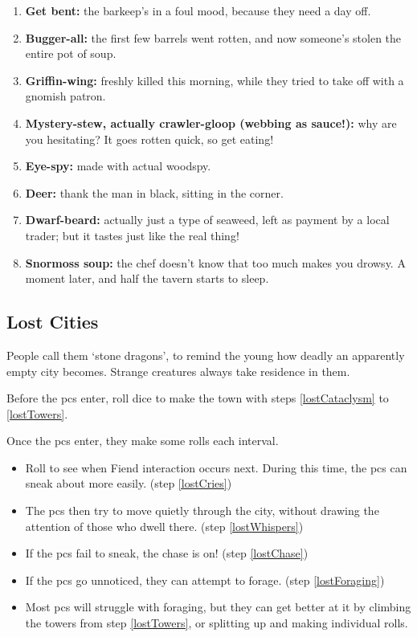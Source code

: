\begin{multicols}{2}
\begin{enumerate}
\item
  \textbf{Get bent:} the barkeep's in a foul mood, because they need a day off.
\item
  \textbf{Bugger-all:} the first few barrels went rotten, and now someone's stolen the entire pot of soup.
\item
  \textbf{Griffin-wing:} freshly killed this morning, while they tried to take off with a gnomish patron.
\item
  \textbf{Mystery-stew, actually crawler-gloop (webbing as sauce!):} why are you hesitating?
  It goes rotten quick, so get eating!
\item
  \textbf{Eye-spy:} made with actual woodspy.
\item
  \textbf{Deer:} thank the man in black, sitting in the corner.
\item
  \textbf{Dwarf-beard:} actually just a type of seaweed, left as payment by a local trader; but it tastes just like the real thing!
\item
  \textbf{Snormoss soup:} the chef doesn't know that too much makes you drowsy.
  A moment later, and half the tavern starts to sleep.
\end{enumerate}

\subsection{Lost Cities}
\label{lostCities}

People call them `stone dragons', to remind the young how deadly an apparently empty city becomes.
Strange creatures always take residence in them.

Before the \glspl{pc} enter, roll dice to make the town with steps \ref{lostCataclysm} to \ref{lostTowers}.

Once the \glspl{pc} enter, they make some rolls each \gls{interval}.

\begin{itemize}
  \item
  Roll to see when Fiend interaction occurs next.
  During this time, the \glspl{pc} can sneak about more easily.
  (step \ref{lostCries})
  \item
  The \glspl{pc} then try to move quietly through the city, without drawing the attention of those who dwell there.
  (step \ref{lostWhispers})
  \item
  If the \glspl{pc} fail to sneak, the chase is on!
  (step \ref{lostChase})
  \item
  If the \glspl{pc} go unnoticed, they can attempt to forage.
  (step \ref{lostForaging})
  \item
  Most \glspl{pc} will struggle with foraging, but they can get better at it by climbing the towers from step \ref{lostTowers}, or splitting up and making individual rolls.
\end{itemize}


\end{multicols}

